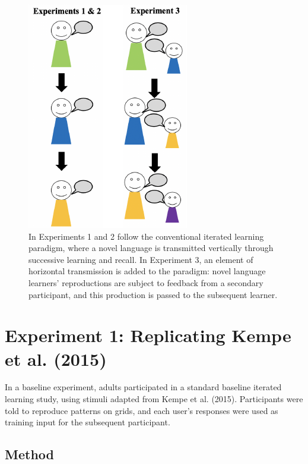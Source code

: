 \documentclass[10pt, letterpaper]{article}
\newenvironment{CodeChunk}{}{}
\begin{document}
\begin{CodeChunk}
\begin{figure}[tb]

{\centering \includegraphics{figs/baseline_schem-1} 

}

\caption[In Experiments 1 and 2 follow the conventional iterated learning paradigm, where a novel language is transmitted vertically through successive learning and recall]{In Experiments 1 and 2 follow the conventional iterated learning paradigm, where a novel language is transmitted vertically through successive learning and recall. In Experiment 3, an element of horizontal transmission is added to the paradigm: novel language learners' reproductions are subject to feedback from a secondary participant, and this production is passed to the subsequent learner.}\label{fig:baseline_schem}
\end{figure}
\end{CodeChunk}

\section{Experiment 1: Replicating Kempe et al.
(2015)}\label{experiment-1-replicating-kempe-2015}

In a baseline experiment, adults participated in a standard baseline
iterated learning study, using stimuli adapted from Kempe et al. (2015).
Participants were told to reproduce patterns on grids, and each user's
responses were used as training input for the subsequent participant.

\subsection{Method}\label{method}
\end{document}

